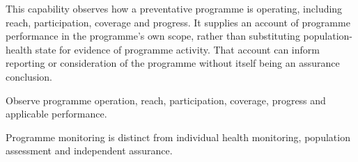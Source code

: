 This capability observes how a preventative programme is operating, including reach, participation, coverage and progress. It supplies an account of programme performance in the programme's own scope, rather than substituting population-health state for evidence of programme activity. That account can inform reporting or consideration of the programme without itself being an assurance conclusion.



Observe programme operation, reach, participation, coverage, progress and applicable performance.



Programme monitoring is distinct from individual health monitoring, population assessment and independent assurance.


